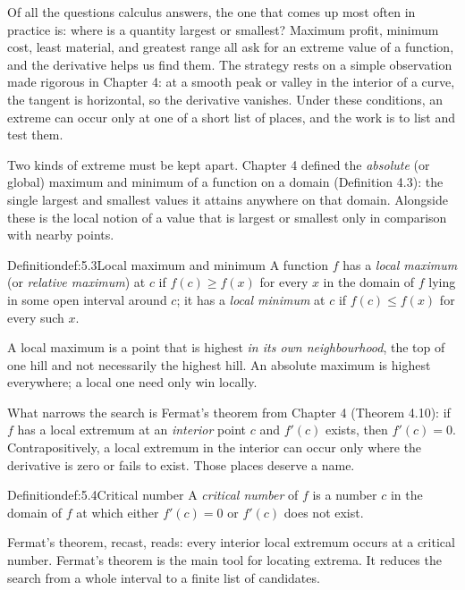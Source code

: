 \documentclass[a4paper,12pt,oneside]{memoir}
\begin{document}
Of all the questions calculus answers, the one that comes up most often in practice is: where is a quantity largest or smallest? Maximum profit, minimum cost, least material, and greatest range all ask for an extreme value of a function, and the derivative helps us find them. The strategy rests on a simple observation made rigorous in Chapter 4: at a smooth peak or valley in the interior of a curve, the tangent is horizontal, so the derivative vanishes. Under these conditions, an extreme can occur only at one of a short list of places, and the work is to list and test them.

Two kinds of extreme must be kept apart. Chapter 4 defined the \emph{absolute} (or global) maximum and minimum of a function on a domain (Definition 4.3): the single largest and smallest values it attains anywhere on that domain. Alongside these is the local notion of a value that is largest or smallest only in comparison with nearby points.

\begin{envdefinition}{Definition}{def:5.3}{Local maximum and minimum}
A function \(f\) has a \emph{local maximum} (or \emph{relative maximum}) at \(c\) if \(f(c) \ge f(x)\) for every \(x\) in the domain of \(f\) lying in some open interval around \(c\); it has a \emph{local minimum} at \(c\) if \(f(c) \le f(x)\) for every such \(x\).

\begin{informal}
A local maximum is a point that is highest \emph{in its own neighbourhood}, the top of one hill and not necessarily the highest hill. An absolute maximum is highest everywhere; a local one need only win locally.
\end{informal}
\end{envdefinition}
What narrows the search is Fermat’s theorem from Chapter 4 (Theorem 4.10): if \(f\) has a local extremum at an \emph{interior} point \(c\) and \(f'(c)\) exists, then \(f'(c) = 0\). Contrapositively, a local extremum in the interior can occur only where the derivative is zero or fails to exist. Those places deserve a name.

\begin{envdefinition}{Definition}{def:5.4}{Critical number}
A \emph{critical number} of \(f\) is a number \(c\) in the domain of \(f\) at which either \(f'(c) = 0\) or \(f'(c)\) does not exist.
\end{envdefinition}
Fermat’s theorem, recast, reads: every interior local extremum occurs at a critical number. Fermat’s theorem is the main tool for locating extrema. It reduces the search from a whole interval to a finite list of candidates.
\end{document}
